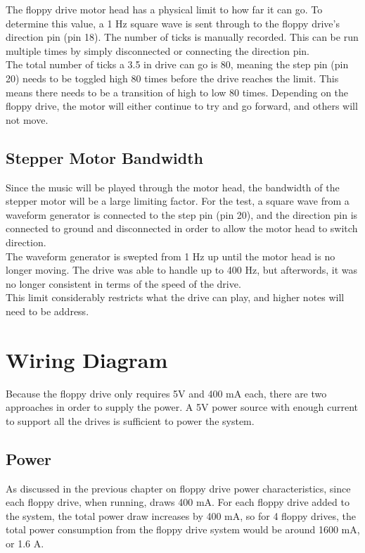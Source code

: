 \documentclass[11pt, a4paper]{report}
\begin{document}
The floppy drive motor head has a physical limit to how far it can go. To determine this value, a 1 Hz square wave is sent through to the floppy drive's direction pin (pin 18). The number of ticks is manually recorded. This can be run multiple times by simply disconnected or connecting the direction pin. \\

The total number of ticks a 3.5 in drive can go is 80, meaning the step pin (pin 20) needs to be toggled high 80 times before the drive reaches the limit. This means there needs to be a transition of high to low 80 times. Depending on the floppy drive, the motor will either continue to try and go forward, and others will not move. \\

\section{Stepper Motor Bandwidth}

Since the music will be played through the motor head, the bandwidth of the stepper motor will be a large limiting factor. For the test, a square wave from a waveform generator is connected to the step pin (pin 20), and the direction pin is connected to ground and disconnected in order to allow the motor head to switch direction. \\

The waveform generator is swepted from 1 Hz up until the motor head is no longer moving. The drive was able to handle up to 400 Hz, but afterwords, it was no longer consistent in terms of the speed of the drive. \\

This limit considerably restricts what the drive can play, and higher notes will need to be address. 



\chapter{Wiring Diagram}

Because the floppy drive only requires 5V and 400 mA each, there are two approaches in order to supply the power. A 5V power source with enough current to support all the drives is sufficient to power the system.
\section{Power}


As discussed in the previous chapter on floppy drive power characteristics, since each floppy drive, when running, draws 400 mA. For each floppy drive added to the system, the total power draw increases by 400 mA, so for 4 floppy drives, the total power consumption from the floppy drive system would be around 1600 mA, or 1.6 A. 
  
\end{document}
